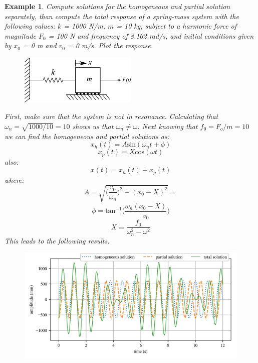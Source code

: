 \documentclass[12pt,letter]{article}
\newtheorem{ex}{Example}
\numberwithin{ex}{section} %
\newenvironment{example}{\begin{mdframed}[middlelinewidth=0.5mm]\begin{ex}\normalfont}{\end{ex}\end{mdframed}}
\begin{document}
\begin{example}

			Compute solutions for the homogeneous and partial solution separately, than compute the total response of a spring-mass system with the following values: $k$ = 1000 N/m, $m$ = 10 kg, subject to a harmonic force of magnitude $F_0$ = 100 N and frequency of 8.162 rad/s, and initial conditions given by $x_0$ = 0 m and $v_0$ = 0 m/s. Plot the response.
			
			\begin{figure}[H]
				\centering
				\includegraphics[width=0.5\textwidth]{../Figures/forced_spring_mass_system.png}
			\end{figure}
			
			First, make sure that the system is not in resonance. Calculating that $\omega_n = \sqrt{1000/10} = 10$ shows us that $\omega_n \neq \omega$. Next knowing that $f_0 = F_o/m = 10$ we can find the homogeneous and partial solutions as:
			\begin{equation}
				x_h(t) = A\text{sin}(\omega_n t + \phi)
			\end{equation}				
			\begin{equation}
				x_p(t) = X\text{cos}(\omega t) 
			\end{equation}	
			also:			
			\begin{equation}
				x(t) = x_h(t) + x_p(t)
			\end{equation}	
			where:			
			\begin{equation}
				A = \sqrt{\bigg(\frac{v_0}{\omega_n}\bigg)^2+(x_0-X)^2} = 
			\end{equation}				
			\begin{equation}
				\phi = \text{tan}^{-1}\bigg(\frac{\omega_n(x_0-X)}{v_0}\bigg)
			\end{equation}				
			\begin{equation}
				X = \frac{f_0}{\omega_n^2-\omega^2}
			\end{equation}			
			This leads to the following results. 
			\begin{figure}[H]
				\centering
				\includegraphics[]{../Figures/topic_6_example_1.png}
			\end{figure}			

\end{example}
\end{document}

